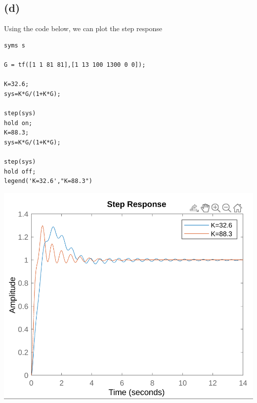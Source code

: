 \documentclass[12pt]{article}
\begin{document}
\subsection*{(d)}
Using the code below, we can plot the step response
\begin{verbatim}
syms s

G = tf([1 1 81 81],[1 13 100 1300 0 0]);

K=32.6;
sys=K*G/(1+K*G);

step(sys)
hold on;
K=88.3;
sys=K*G/(1+K*G);

step(sys)
hold off;
legend('K=32.6',"K=88.3")
\end{verbatim}
\includegraphics[scale=0.25]{Problem2Fig3.png}\\
\end{document}
